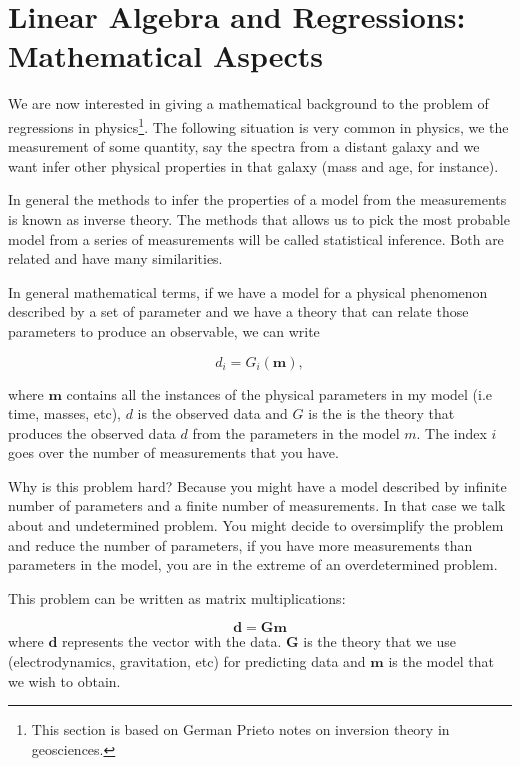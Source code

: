 \documentclass{article}
\begin{document}


\section{Linear Algebra and Regressions: Mathematical Aspects}

We are now interested in giving a mathematical background to the problem of regressions in physics\footnote{This section is based on German Prieto notes on inversion theory in geosciences.}. 
The following situation is very common in physics, we the measurement of some quantity, say the spectra from a distant galaxy and we want infer other physical properties in that galaxy (mass and age, for instance).

In general the methods to infer the properties of a model from the measurements is known as inverse theory. The methods that allows us to pick the most probable model from a series of measurements will be called statistical inference. Both are related and have many similarities.

In general mathematical terms, if we have a model for a physical phenomenon described by a set of parameter and we have a theory that can relate those parameters to produce an observable, we can write

\begin{equation}
d_{i} = G_i (\mathbf{m}),
\end{equation}

where ${\mathbf m}$ contains all the instances of the physical parameters in my model (i.e time, masses, etc), $d$ is the observed data and $G$ is the is the theory that produces the observed data $d$ from the parameters in the model $m$. The index $i$ goes over the number of measurements that you have.

Why is this problem hard? Because you might have a model described by infinite number of parameters and a finite number of measurements. In that case we talk about and undetermined problem. You might decide to oversimplify the problem and reduce the number of parameters, if you have more measurements than parameters in the model, you are in the extreme of an overdetermined problem.

This problem can be written as matrix multiplications:


\begin{equation}
\mathbf{d} = \mathbf{G}\mathbf{m}
\end{equation}
where $\mathbf{d}$ represents the vector with the data. $\mathbf{G}$ is the theory that we use (electrodynamics, gravitation, etc) for predicting data and $\mathbf{m}$ is the model that we wish to obtain.
\end{document}
